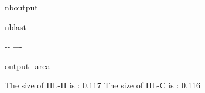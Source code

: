 \documentclass[letterpaper,10pt,english]{sphinxmanual}
\begin{document}
\begin{sphinxuseclass}{nboutput}
\begin{sphinxuseclass}{nblast}
{

\kern-\sphinxverbatimsmallskipamount\kern-\baselineskip
\kern+\FrameHeightAdjust\kern-\fboxrule
\vspace{\nbsphinxcodecellspacing}

\begin{sphinxuseclass}{output_area}
\begin{sphinxuseclass}{}


\begin{sphinxVerbatim}[commandchars=\\\{\}]
The size of HL-H is : 0.117
The size of HL-C is : 0.116
\end{sphinxVerbatim}



\end{sphinxuseclass}
\end{sphinxuseclass}
}

\end{sphinxuseclass}
\end{sphinxuseclass}
\end{document}
